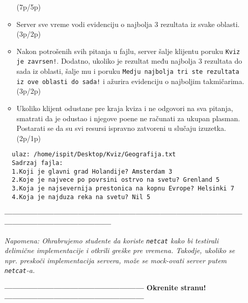 \documentclass[]{article}
\begin{document}
\begin{enumerate}
\begin{itemize}
\begin{enumerate}
  \end{enumerate} \hfill (7p/5p)
  \item Server sve vreme vodi evidenciju o najbolja 3 rezultata iz svake oblasti. \hfill (3p/2p)
  \item Nakon potrošenih svih pitanja u fajlu, server šalje klijentu poruku \texttt{Kviz je zavrsen!}. Dodatno, ukoliko je rezultat među najbolja 3 rezultata do sada iz oblasti, šalje mu i poruku \texttt{Medju najbolja tri ste rezultata iz ove oblasti do sada!} i ažurira evidenciju o najboljim takmičarima. \hfill (3p/2p)
  \item Ukoliko klijent odustane pre kraja kviza i ne odgovori na sva pitanja, smatrati da je odustao i njegove poene ne računati za ukupan plasman. Postarati se da su svi resursi ispravno zatvoreni u slučaju izuzetka. \hfill (2p/1p)
\end{itemize}

\vspace{15pt}

\noindent
\begin{lstlisting}
  ulaz: /home/ispit/Desktop/Kviz/Geografija.txt
  Sadrzaj fajla:
  1.Koji je glavni grad Holandije? Amsterdam 3 
  2.Koje je najvece po povrsini ostrvo na svetu? Grenland 5
  3.Koja je najsevernija prestonica na kopnu Evrope? Helsinki 7
  4.Koja je najduza reka na svetu? Nil 5
\end{lstlisting}

\vspace{15pt}
\begin{center}
  \textbf{------------------------------------------------------------------------------------------------------------------------------}
\end{center}
\textit{Napomena: Ohrabrujemo studente da koriste \texttt{netcat} kako bi testirali delimi\v{c}ne implementacije i otkrili gre\v{s}ke pre vremena. Takodje, ukoliko se npr. presko\v{c}i implementacija servera, mo\v{z}e se mock-ovati server putem \texttt{netcat}-a.} 
\begin{center}
  \textbf{--------------------------------------------------- Okrenite stranu! ---------------------------------------------------}
\end{center}

\newpage


\end{enumerate}
\end{document}
